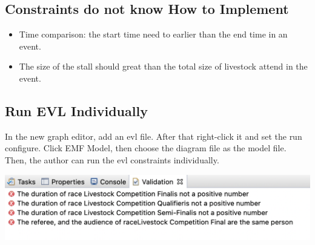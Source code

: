 \documentclass[12pt]{article}
\begin{document}
\subsection{Constraints do not know How to Implement}
\begin{itemize}
    \item Time comparison: the start time need to earlier than the end time in an event.
    \item The size of the stall should great than the total size of livestock attend in the event.
\end{itemize}

\subsection{Run EVL Individually}
In the new graph editor, add an evl file. After that right-click it and set the run configure. 
Click EMF Model, then choose the diagram file as the model file. Then, the author can run the evl constraints individually.

\includegraphics[scale = 0.6]{img/constraint-error}
\end{document}
